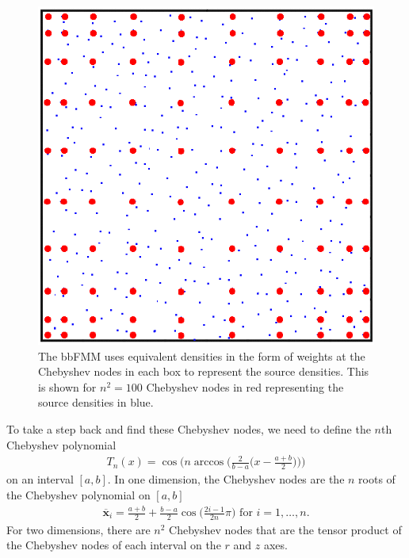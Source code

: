 \documentclass[11pt, oneside]{article}   	%
\begin{document}
\begin{figure}[h]
\caption{The bbFMM uses equivalent densities in the form of weights at the Chebyshev nodes in each box to represent the source densities. This is shown for $n^2=100$ Chebyshev nodes in red representing the source densities in blue.}
\label{fig:8}
\centering
\includegraphics[scale=0.25]{./images/b0wChebynodes}
\end{figure}

To take a step back and find these Chebyshev nodes, we need to define the $n$th Chebyshev polynomial
\begin{align*}
T_n(x)=\cos\bigg(n\arccos\bigg(\frac{2}{b-a}\bigg(x-\frac{a+b}{2}\bigg)\bigg)\bigg)
\end{align*}
on an interval $[a,b]$. In one dimension, the Chebyshev nodes are the $n$ roots of the Chebyshev polynomial on $[a,b]$
\begin{align*}
\mathbf{\overline{x}}_i=\frac{a+b}{2}+\frac{b-a}{2}\cos\bigg(\frac{2i-1}{2n}\pi\bigg)\mbox{ for }i=1,\dots,n.
\end{align*}
For two dimensions, there are $n^2$ Chebyshev nodes that are the tensor product of the Chebyshev nodes of each interval on the $r$ and $z$ axes.
\end{document}

